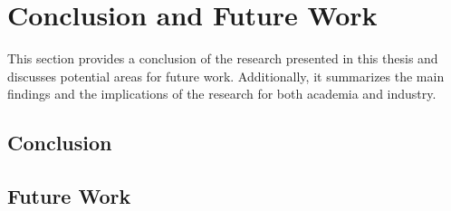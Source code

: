 \chapter{Conclusion and Future Work}
This section provides a conclusion of the research presented in this thesis and discusses potential areas for future work. Additionally, it summarizes the main findings and the implications of the research for both academia and industry.
\section{Conclusion}


\section{Future Work}
